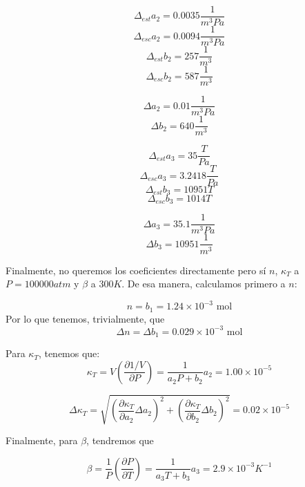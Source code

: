 \documentclass[a4paper,12pt]{article}
\begin{document}
  $$\Delta_{est} a_2 = 0.0035 \frac{1}{m^3 Pa} $$
  $$\Delta_{esc} a_2 = 0.0094 \frac{1}{m^3 Pa} $$
  $$\Delta_{est} b_2= 257  \frac{1}{m^3}$$
  $$\Delta_{esc} b_2 = 587 \frac{1}{m^3}$$

  \begin{equation}
    \Delta a_2 = 0.01 \frac{1}{m^3 Pa}
  \end{equation}
  \begin{equation}
    \Delta b_2 = 640 \frac{1}{m^3}
  \end{equation}

  $$\Delta_{est} a_3 = 35\frac{T}{ Pa}   $$
  $$\Delta_{esc} a_3 = 3.2418 \frac{T}{ Pa} $$
  $$\Delta_{est} b_3= 10951  T$$
  $$\Delta_{esc} b_3 = 1014 T$$

  \begin{equation}
    \Delta a_3 = 35.1 \frac{1}{m^3 Pa}
  \end{equation}
  \begin{equation}
    \Delta b_3 = 10951 \frac{1}{m^3}
  \end{equation}

Finalmente, no queremos los coeficientes directamente pero sí $n$, $\kappa_{T}$ a $P = 100000 atm$ y $\beta$ a $300K$. De esa manera, calculamos primero a $n$:

\begin{equation}
  n = b_1 = 1.24 \times 10^{-3} \text{ mol}
\end{equation}
Por lo que tenemos, trivialmente, que
\begin{equation}
  \Delta n = \Delta b_1 = 0.029 \times 10^{-3} \text{ mol}
\end{equation}

Para $\kappa_T$, tenemos que:
\begin{equation}
   \kappa_T = V \left(\frac{\partial 1/V}{\partial P}\right) = \frac{1}{a_2 P + b_2 }a_2 = 1.00 \times 10^{-5}
\end{equation} 

\begin{equation}
  \Delta \kappa_T = \sqrt{\left(\frac{\partial \kappa_T }{\partial a_2} \Delta a_2\right)^2 + \left(\frac{\partial \kappa_T }{\partial b_2} \Delta b_2\right)^2} = 0.02 \times 10^{-5}
\end{equation}

Finalmente, para $\beta$, tendremos que

\begin{equation}
   \beta = \frac{1}{P}\left(\frac{\partial P}{\partial T}\right) = \frac{1}{a_3 T + b_3 }a_3 = 2.9 \times 10^{-3} K^{-1}
\end{equation} 
\end{document}
